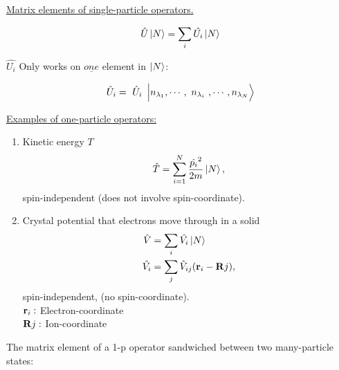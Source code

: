 \noindent \uline{Matrix elements of single-particle operators.}



\begin{equation*}
	\hat{U} \ket{N}= \sum_i \hat{U_i} \ket{N}
\end{equation*}

$\hat{U_i}$ Only works on $\underline{one}$ element in $\ket{N}$:




	

\begin{equation*}
	\hat{U}_i = \tikzmark{node1}{\hat{U}_i}\ket{n_{\lambda_1},\cdots, \tikzmark[black]{node2}{n_{\lambda_i}}, \cdots, n_{\lambda_N}} 
\end{equation*}
\linebreak


\noindent \uline{Examples of one-particle operators:}

\begin{enumerate}
	\item
		Kinetic energy $T$
		\begin{equation}
			\hat{T}= \sum_{i=1}^{N} \frac{\hat{p_i}^2}{2m} \ket{N},
		\end{equation}
		spin-independent (does not involve spin-coordinate).
	\item
		Crystal potential that electrons move through in a solid
		\begin{align}
			\hat{V} &= \sum_i \hat{V_i} \ket{N}\\
			\hat{V_i} &= \sum_j \hat{V}_{ij} (\vb{r}_i-\vb{R}j),
		\end{align}
		spin-independent, (no spin-coordinate).\\
		$\vb{r}_i:$ Electron-coordinate\\
		$\vb{R}j:$ Ion-coordinate
\end{enumerate}

\noindent The matrix element of a 1-p operator sandwiched between two many-particle states:

